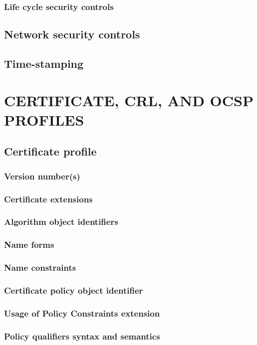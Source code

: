 \documentclass[10pt]{article}
\begin{document}
\subsubsection{Life cycle security controls}
\subsection{Network security controls}
\subsection{Time-stamping}
\section{CERTIFICATE, CRL, AND OCSP PROFILES}
\subsection{Certificate profile}
\subsubsection{Version number(s)}
\subsubsection{Certificate extensions}
\subsubsection{Algorithm object identifiers}
\subsubsection{Name forms}
\subsubsection{Name constraints}
\subsubsection{Certificate policy object identifier}
\subsubsection{Usage of Policy Constraints extension}
\subsubsection{Policy qualifiers syntax and semantics}
\end{document}
